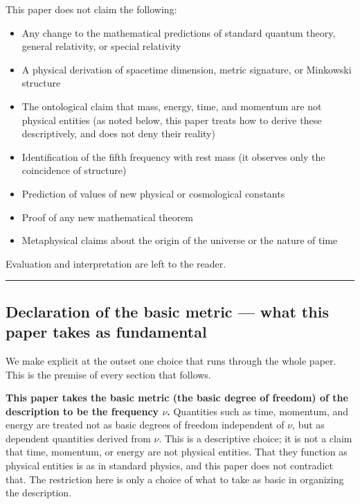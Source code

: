 \documentclass[
]{article}
\providecommand{\tightlist}{%
  \setlength{\itemsep}{0pt}\setlength{\parskip}{0pt}}
\begin{document}
This paper does not claim the following:

\begin{itemize}
\tightlist
\item
  Any change to the mathematical predictions of standard quantum theory,
  general relativity, or special relativity
\item
  A physical derivation of spacetime dimension, metric signature, or
  Minkowski structure
\item
  The ontological claim that mass, energy, time, and momentum are not
  physical entities (as noted below, this paper treats how to derive
  these descriptively, and does not deny their reality)
\item
  Identification of the fifth frequency with rest mass (it observes only
  the coincidence of structure)
\item
  Prediction of values of new physical or cosmological constants
\item
  Proof of any new mathematical theorem
\item
  Metaphysical claims about the origin of the universe or the nature of
  time
\end{itemize}

Evaluation and interpretation are left to the reader.

\begin{center}\rule{0.5\linewidth}{0.5pt}\end{center}

\subsection{Declaration of the basic metric --- what this paper takes as
fundamental}\label{declaration-of-the-basic-metric-what-this-paper-takes-as-fundamental}

We make explicit at the outset one choice that runs through the whole
paper. This is the premise of every section that follows.

\textbf{This paper takes the basic metric (the basic degree of freedom)
of the description to be the frequency \(\nu\).} Quantities such as
time, momentum, and energy are treated not as basic degrees of freedom
independent of \(\nu\), but as dependent quantities derived from
\(\nu\). This is a descriptive choice; it is not a claim that time,
momentum, or energy are not physical entities. That they function as
physical entities is as in standard physics, and this paper does not
contradict that. The restriction here is only a choice of what to take
as basic in organizing the description.
\end{document}
